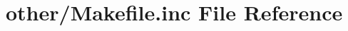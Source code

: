 \hypertarget{other_2_makefile_8inc}{\section{other/\+Makefile.inc File Reference}
\label{other_2_makefile_8inc}
}
